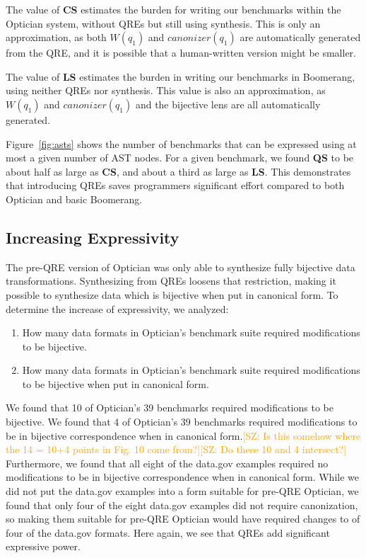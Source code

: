 \documentclass[acmsmall,review,anonymous]{acmart}
\newcommand{\FINISH}[3]{\ifdraft\textcolor{#1}{[#2: #3]}\fi}
\newcommand{\saz}[1]{\FINISH{orange}{SZ}{#1}}
\newcommand{\kw}[1]{\ensuremath{\mathit{#1}}}
\newcommand{\canonizer}{\ensuremath{\kw{canonizer}}}
\newcommand{\QRESize}{\textbf{QS}}
\newcommand{\CanonizerAndSpecSize}{\textbf{CS}}
\newcommand{\LensAndSpecSize}{\textbf{LS}}
\begin{document}
The value of \CanonizerAndSpecSize{} estimates the burden for writing our
benchmarks within the Optician system, without QREs but still using
synthesis. This is only an approximation, as both $W(q_1)$ and $\canonizer(q_1)$ are
automatically generated from the QRE, and it is possible that a human-written
version might be smaller.

The value of \LensAndSpecSize{} estimates the burden in writing our benchmarks
in Boomerang, using neither QREs nor synthesis. This value is also an
approximation, as $W(q_1)$ and $\canonizer(q_1)$ and the bijective lens are all
automatically generated.

Figure~\ref{fig:asts} shows the number of benchmarks that can be expressed using
at most a given number of AST nodes. For a given benchmark, we found \QRESize{}
to be about half as large as \CanonizerAndSpecSize, and about a third as large
as \LensAndSpecSize{}. This demonstrates that introducing QREs saves programmers
significant effort compared to both Optician and basic Boomerang.

\subsection{Increasing Expressivity}

The pre-QRE version of Optician was only able to synthesize fully bijective data
transformations.  Synthesizing from QREs loosens that restriction, making it
possible to synthesize data which is bijective when put in canonical form. To
determine the increase of expressivity, we analyzed:
\begin{enumerate}
  \item How many data formats in Optician's benchmark suite required modifications
  to be bijective.
  \item How many data formats in Optician's benchmark suite required modifications
  to be bijective when put in canonical form.
\end{enumerate}

We found that 10 of Optician's 39 benchmarks required modifications to be
bijective. We found that 4 of Optician's 39 benchmarks required modifications to
be in bijective correspondence when in canonical form.\saz{Is this somehow where
  the 14 = 10+4 points in Fig. 10 come from?}\saz{Do these 10 and 4 intersect?}
Furthermore, we found that all eight of the data.gov examples required no
modifications to be in bijective correspondence when in canonical form. While we
did not put the data.gov examples into a form suitable for pre-QRE Optician, we
found that only four of the eight data.gov examples did not require
canonization, so making them suitable for pre-QRE Optician would have required 
changes to of four of the data.gov formats.  Here again, we see that QREs add
significant expressive power.
\end{document}
